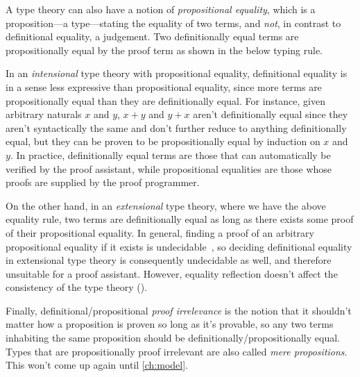 A type theory can also have a notion of \emph{propositional equality},
which is a proposition---a type---stating the equality of two terms,
and \emph{not}, in contrast to definitional equality, a judgement.
Two definitionally equal terms are propositionally equal by the  proof term
as shown in the below typing rule.

In an \emph{intensional} type theory with propositional equality,
definitional equality is in a sense less expressive than propositional equality,
since more terms are propositionally equal than they are definitionally equal.
For instance, given arbitrary naturals $x$ and $y$,
$x + y$ and $y + x$ aren't definitionally equal since they aren't syntactically the same
and don't further reduce to anything definitionally equal,
but they can be proven to be propositionally equal by induction on $x$ and $y$.
In practice, definitionally equal terms are those that can automatically be verified by the proof assistant,
while propositional equalities are those whose proofs are supplied by the proof programmer.

\vspace{-0.5\baselineskip}

On the other hand, in an \emph{extensional} type theory, where we have the above equality  rule,
two terms are definitionally equal as long as there exists some proof of their propositional equality.
In general, finding a proof of an arbitrary propositional equality if it exists is undecidable~\citep{extensional-concepts},
so deciding definitional equality in extensional type theory is consequently undecidable as well,
and therefore unsuitable for a proof assistant.
However, equality reflection doesn't affect the consistency of the type theory (\cf \opcit).

Finally, definitional/propositional \emph{proof irrelevance}
is the notion that it shouldn't matter how a proposition is proven so long as it's provable,
so any two terms inhabiting the same proposition should be definitionally/propositionally equal.
Types that are propositionally proof irrelevant are also called \emph{mere propositions}.
This won't come up again until \cref{ch:model}.

